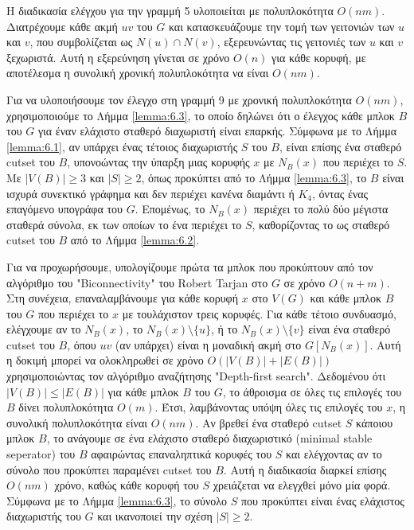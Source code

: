 Η διαδικασία ελέγχου για την γραμμή 5 υλοποιείται με πολυπλοκότητα $O(nm)$. Διατρέχουμε κάθε ακμή $uv$ του $G$ και κατασκευάζουμε την τομή των γειτονιών των $u$ και $v$, που συμβολίζεται ως $N(u) \cap N(v)$, εξερευνώντας τις γειτονιές των $u$ και $v$ ξεχωριστά. Αυτή η εξερεύνηση γίνεται σε χρόνο $O(n)$ για κάθε κορυφή, με αποτέλεσμα η συνολική χρονική πολυπλοκότητα να είναι $O(nm)$.

Για να υλοποιήσουμε τον έλεγχο στη γραμμή 9 με χρονική πολυπλοκότητα $O(nm)$, χρησιμοποιούμε το Λήμμα \ref{lemma:6.3}, το οποίο δηλώνει ότι ο έλεγχος κάθε μπλοκ $B$ του $G$ για έναν ελάχιστο σταθερό διαχωριστή είναι επαρκής. Σύμφωνα με το Λήμμα \ref{lemma:6.1}, αν υπάρχει ένας τέτοιος διαχωριστής $S$ του $B$, είναι επίσης ένα σταθερό cutset του $B$, υπονοώντας την ύπαρξη μιας κορυφής $x$ με $N_B(x)$ που περιέχει το $S$. Με $|V(B)| \geq 3$ και $|S| \geq 2$, όπως προκύπτει από το Λήμμα \ref{lemma:6.3}, το $B$ είναι ισχυρά συνεκτικό γράφημα και δεν περιέχει κανένα διαμάντι ή $K_4$, όντας ένας επαγόμενο υπογράφα του $G$. Επομένως, το $N_B(x)$ περιέχει το πολύ δύο μέγιστα σταθερά σύνολα, εκ των οποίων το ένα περιέχει το $S$, καθορίζοντας το ως σταθερό cutset του $B$ από το Λήμμα \ref{lemma:6.2}.

Για να προχωρήσουμε, υπολογίζουμε πρώτα τα μπλοκ που προκύπτουν από τον αλγόριθμο του "Biconnectivity" του Robert Tarjan \cite{tarjan-depth-first-search} στο $G$ σε χρόνο $O(n + m)$. Στη συνέχεια, επαναλαμβάνουμε για κάθε κορυφή $x$ στο $V(G)$ και κάθε μπλοκ $B$ του $G$ που περιέχει το $x$ με τουλάχιστον τρεις κορυφές. Για κάθε τέτοιο συνδυασμό, ελέγχουμε αν το $N_B(x)$, το $N_B(x) \setminus \{u\}$, ή το $N_B(x) \setminus \{v\}$ είναι ένα σταθερό cutset του $B$, όπου $uv$ (αν υπάρχει) είναι η μοναδική ακμή στο $G[N_B(x)]$. Αυτή η δοκιμή μπορεί να ολοκληρωθεί σε χρόνο $O(|V(B)| + |E(B)|)$ χρησιμοποιώντας τον αλγόριθμο αναζήτησης "Depth-first search". Δεδομένου ότι $|V(B)| \leq |E(B)|$ για κάθε μπλοκ $B$ του $G$, το άθροισμα σε όλες τις επιλογές του $B$ δίνει πολυπλοκότητα $O(m)$. Έτσι, λαμβάνοντας υπόψη όλες τις επιλογές του $x$, η συνολική πολυπλοκότητα είναι $O(nm)$. Αν βρεθεί ένα σταθερό cutset $S$ κάποιου μπλοκ $B$, το ανάγουμε σε ένα ελάχιστο σταθερό διαχωριστικό (minimal stable seperator) του $B$ αφαιρώντας επαναληπτικά κορυφές του $S$ και ελέγχοντας αν το σύνολο που προκύπτει παραμένει cutset του $B$. Αυτή η διαδικασία διαρκεί επίσης $O(nm)$ χρόνο, καθώς κάθε κορυφή του $S$ χρειάζεται να ελεγχθεί μόνο μία φορά. Σύμφωνα με το Λήμμα \ref{lemma:6.3}, το σύνολο $S$ που προκύπτει είναι ένας ελάχιστος διαχωριστής του $G$ και ικανοποιεί την σχέση $|S| \geq 2$.

